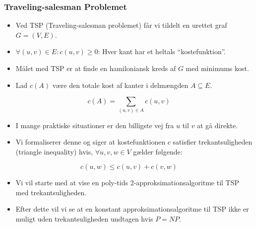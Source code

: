 \begin{frame}[allowframebreaks]
  \frametitle{Traveling-salesman Problemet}
  \begin{itemize}
    \item Ved TSP (Traveling-salesman problemet) får vi tildelt en urettet graf $G = (V,E)$.
    \item $\forall (u,v) \in E : c(u,v) \ge 0$: Hver kant har et heltals ``kostefunktion''.
    \item Målet med TSP er at finde en hamiloniansk kreds af $G$ med minimums kost.
    \item Lad $c(A)$ være den totale kost af kanter i delmængden $A \subseteq E$.
  \end{itemize}

  \begin{equation*}
c(A) = \sum_{(u,v) \in A} c(u,v)
  \end{equation*}
  \begin{itemize}
    \item I mange praktiske situationer er den billigste vej fra $u$ til $v$ at gå direkte.
    \item Vi formaliserer denne og siger at kostefunktionen $c$ satisfier trekantsuligheden (triangle inequality) hvis, $\forall u,v, w \in V$ gælder følgende:
  \end{itemize}
  \begin{equation*}
c(u,w) \le c(u,v) + c(v,w)
  \end{equation*}
  \begin{itemize}
    \item Vi vil starte med at vise en poly-tids 2-approksimationsalgoritme til TSP med trekantsuligheden.
    \item Efter dette vil vi se at en konstant approksimationsalgoritme til TSP ikke er muligt uden trekantsuligheden undtagen hvis $P = NP$.
  \end{itemize}
\end{frame}



